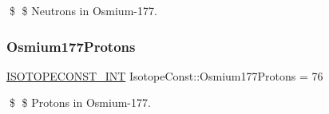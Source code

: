 \$ \$ Neutrons in Osmium-\/177. \mbox{\label{group___isotope_const-_osmium-_os177_ga41db970aec1ce56bd716fcc35d547a3b}} 
\subsubsection{\texorpdfstring{Osmium177\+Protons}{Osmium177Protons}}
{\footnotesize\ttfamily \mbox{\hyperlink{group___isotope_const-_macros_ga5f18360b3e99483a35c32d789e62621c}{I\+S\+O\+T\+O\+P\+E\+C\+O\+N\+S\+T\+\_\+\+I\+NT}} Isotope\+Const\+::\+Osmium177\+Protons = 76}

\$ \$ Protons in Osmium-\/177. 